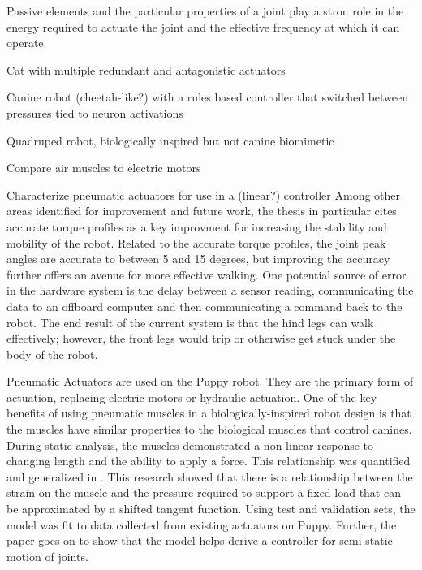 Passive elements and the particular properties of a joint play a stron role in
the energy required to actuate the joint and the effective frequency at which it
can operate. \cite{Na2015}




Cat with multiple redundant and antagonistic actuators
\cite{Rosendo2013}

Canine robot (cheetah-like?) with a rules based controller that switched between
pressures tied to neuron activations
\cite{Pneupard2013}

Quadruped robot, biologically inspired but not canine biomimetic \cite{Wait2014}


Compare air muscles to electric motors
\cite{Tavakoli2008}


Characterize pneumatic actuators for use in a (linear?) controller Among other
areas identified for improvement and future work, the thesis in particular cites
accurate torque profiles as a key improvment for increasing the stability and
mobility of the robot. Related to the accurate torque profiles, the joint peak
angles are accurate to between 5 and 15 degrees, but improving the accuracy
further offers an avenue for more effective walking. One potential source of
error in the hardware system is the delay between a sensor reading,
communicating the data to an offboard computer and then communicating a command
back to the robot. The end result of the current system is that the hind legs
can walk effectively; however, the front legs would trip or otherwise get stuck
under the body of the robot.
\cite{Situm2008}

Pneumatic Actuators are used on the Puppy robot. They are the primary form of
actuation, replacing electric motors or hydraulic actuation. One of the key
benefits of using pneumatic muscles in a biologically-inspired robot design is
that the muscles have similar properties to the biological muscles that control
canines. 
During static analysis, the muscles demonstrated a non-linear response to
changing length and the ability to apply a force. This relationship was
quantified and generalized in \cite{HuntPMuscles}. This research showed that
there is a relationship between the strain on the muscle and the pressure
required to support a fixed load that can be approximated by a shifted tangent
function. Using test and validation sets, the model was fit to data collected
from existing actuators on Puppy. Further, the paper goes on to show that the
model helps derive a controller for semi-static motion of joints. 
\cite{HuntPMuscles}

